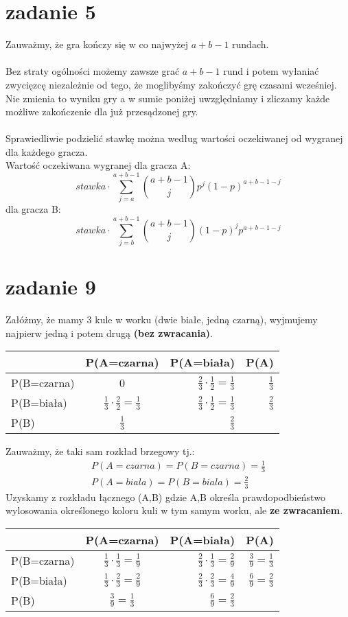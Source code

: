 \documentclass{article}
\begin{document}
\section{zadanie 5}
Zauważmy, że gra kończy się w co najwyżej $a+b-1$ rundach.\\\\
Bez straty ogólności możemy zawsze grać $a+b-1$ rund i potem wyłaniać zwycięzcę niezależnie od tego, że moglibyśmy zakończyć grę czasami wcześniej. Nie zmienia to wyniku gry a w sumie poniżej uwzględniamy i zliczamy każde możliwe zakończenie dla już przesądzonej gry.\\\\
Sprawiedliwie podzielić stawkę można według wartości oczekiwanej od wygranej dla każdego gracza.\\
Wartość oczekiwana wygranej dla gracza A:
$$
stawka\cdot\sum_{j=a}^{a+b-1} \binom{a+b-1}{j}p^j(1-p)^{a+b-1-j}
$$
dla gracza B:
$$
stawka\cdot\sum_{j=b}^{a+b-1} \binom{a+b-1}{j}(1-p)^jp^{a+b-1-j}
$$
\newpage
\section{zadanie 9}
Załóżmy, że mamy 3 kule w worku (dwie białe, jedną czarną), wyjmujemy najpierw jedną i potem drugą \textbf{(bez zwracania)}.
\begin{center}
  \begin{tabular}{ | l | c | r | r |}
    \hline
     & P(A=czarna) & P(A=biała) & P(A)\\ \hline 
    P(B=czarna) & 0 & $\frac{2}{3}\cdot\frac{1}{2} = \frac{1}{3}$ & $\frac{1}{3}$ \\ \hline
    P(B=biała) & $\frac{1}{3}\cdot\frac{2}{2} = \frac{1}{3}$ & $\frac{2}{3}\cdot\frac{1}{2} = \frac{1}{3}$ & $\frac{2}{3}$ \\ \hline
    P(B) & $\frac{1}{3}$ & $\frac{2}{3}$ & \\
    \hline
  \end{tabular}
\end{center}

Zauważmy, że taki sam rozkład brzegowy tj.:
\begin{align*}
P(A=czarna)=P(B=czarna) = \frac13\\
P(A=biala)=P(B=biala) = \frac23
\end{align*}
Uzyskamy z rozkładu łącznego (A,B) gdzie A,B określa prawdopodbieństwo wylosowania określonego koloru kuli w tym samym worku, ale \textbf{ze zwracaniem}.
\begin{center}
  \begin{tabular}{ | l | c | r | r |}
    \hline
     & P(A=czarna) & P(A=biała) & P(A)\\ \hline 
    P(B=czarna) & $\frac{1}{3}\cdot\frac{1}{3} = \frac{1}{9}$ & $\frac{2}{3}\cdot\frac{1}{3} = \frac{2}{9}$ & $\frac39 =\frac{1}{3}$ \\ \hline
    P(B=biała) & $\frac{1}{3}\cdot\frac{2}{3} = \frac{2}{9}$ & $\frac{2}{3}\cdot\frac{2}{3} = \frac{4}{9}$ & $\frac69 = \frac{2}{3}$ \\ \hline
    P(B) & $\frac39 =\frac{1}{3}$ & $\frac69 = \frac{2}{3}$ & \\
    \hline
  \end{tabular}
\end{center}
\end{document}
